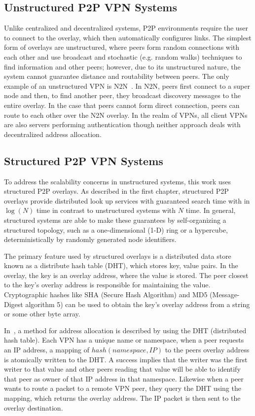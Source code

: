 \subsection{Unstructured P2P VPN Systems} Unlike centralized and decentralized
systems, P2P environments require the user to connect to the overlay, which
then automatically configures links.  The simplest form of overlays are
unstructured, where peers form random connections with each other and use
broadcast and stochastic (e.g. random walks) techniques to find information and
other peers; however, due to its unstructured nature, the system cannot
guarantee distance and routability between peers.  The only example of an
unstructured VPN is N2N~\cite{n2n}.  In N2N, peers first connect to a super
node and then, to find another peer, they broadcast discovery messages to the
entire overlay.  In the case that peers cannot form direct connection, peers
can route to each other over the N2N overlay.  In the realm of VPNs, all client
VPNs are also servers performing authentication though neither approach deals
with decentralized address allocation.

\subsection{Structured P2P VPN Systems}

To address the scalability concerns in unstructured systems, this work uses
structured P2P overlays.  As described in the first chapter, structured P2P
overlays provide distributed look up services with guaranteed search time with
in $\log(N)$ time in contrast to unstructured systems with $N$ time.  In
general, structured systems are able to make these guarantees by
self-organizing a structured topology, such as a one-dimensional (1-D) ring or
a hypercube, deterministically by randomly generated node identifiers.

The primary feature used by structured overlays is a distributed data store
known as a distribute hash table (DHT), which stores key, value pairs.  In the
overlay, the key is an overlay address, where the value is stored.  The peer
closest to the key's overlay address is responsible for maintaining the value.
Cryptographic hashes like SHA (Secure Hash Algorithm) and MD5 (Message-Digest
algorithm 5) can be used to obtain the key's overlay address from a string or
some other byte array.

In~\cite{pcgrid07, i3}, a method for address allocation is described by using
the DHT (distributed hash table).  Each VPN has a unique name or namespace,
when a peer requests an IP address, a mapping of $hash(namespace, IP)$ to the
peers overlay address is atomically written to the DHT.  A success implies that
the writer was the first writer to that value and other peers reading that
value will be able to identify that peer as owner of that IP address in that
namespace.  Likewise when a peer wants to route a packet to a remote VPN peer,
they query the DHT using the mapping, which returns the overlay address.  The
IP packet is then sent to the overlay destination.


